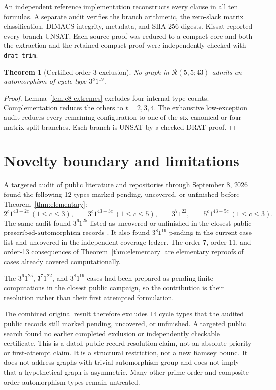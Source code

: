 \documentclass[11pt]{article}
\newtheorem{theorem}{Theorem}
\newcommand{\Rcal}{\mathcal{R}}
\begin{document}
An independent reference implementation reconstructs every clause in all
ten formulas. A separate audit verifies the branch arithmetic, the
zero-slack matrix classification, DIMACS integrity, metadata, and SHA-256
digests. Kissat reported every branch UNSAT. Each source proof was reduced
to a compact core and both the extraction and the retained compact proof
were independently checked with \texttt{drat-trim}.

\begin{theorem}[Certified order-3 exclusion]
\label{thm:c8}
No graph in $\Rcal(5,5;43)$ admits an automorphism of cycle type
$3^8 1^{19}$.
\end{theorem}

\begin{proof}
Lemma~\ref{lem:c8-extremes} excludes four internal-type counts.
Complementation reduces the others to $t=2,3,4$. The exhaustive
low-exception audit reduces every remaining configuration to one of the six
canonical or four matrix-split branches. Each branch is UNSAT by a checked
DRAT proof.
\end{proof}

\section{Novelty boundary and limitations}

A targeted audit of public literature and repositories through September 8,
2026 found the following 12 types marked pending, uncovered, or unfinished
before
Theorem~\ref{thm:elementary}:
\[
2^c1^{43-2c}\ (1\le c\le3),\qquad
3^c1^{43-3c}\ (1\le c\le5),\qquad
3^7 1^{22},\qquad
5^c1^{43-5c}\ (1\le c\le3).
\]
The same audit found $3^6 1^{25}$ listed as uncovered or unfinished in the
closest public prescribed-automorphism records \cite{Wustep2026,Kriebel2026}.
It also found $3^8 1^{19}$ pending in the current case list and uncovered in
the independent coverage ledger.
The order-7, order-11, and order-13 consequences of
Theorem~\ref{thm:elementary} are elementary reproofs of cases already covered
computationally.

The $3^6 1^{25}$, $3^7 1^{22}$, and $3^8 1^{19}$ cases had been prepared as
pending finite computations in the closest public campaign, so the
contribution is their resolution rather than their first attempted
formulation.

The combined original result therefore excludes 14 cycle types that the
audited public records still marked pending, uncovered, or unfinished. A
targeted public search found no earlier completed exclusion or independently
checkable certificate. This is a dated public-record resolution claim, not
an absolute-priority or first-attempt claim. It is a structural restriction,
not a new Ramsey bound. It does not address graphs with trivial automorphism
group and does not imply that a hypothetical graph is asymmetric. Many other
prime-order and composite-order automorphism types remain untreated.
\end{document}
